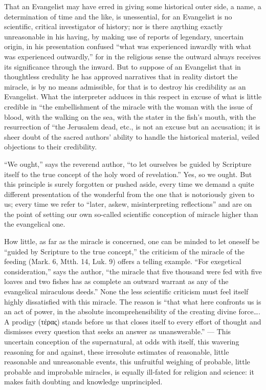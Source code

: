 \documentclass[12pt,a4paper,openany]{book}
\newcommand{\opage}[1]{\marginnote{\footnotesize\textit{[#1]}}}
\begin{document}
That an Evangelist may have erred in giving some historical outer side,
a name, a determination of time
and the like, is unessential, for an Evangelist is
no scientific, critical investigator of history; nor
is there anything exactly unreasonable in his having, by making use of reports
of legendary, uncertain origin, in his presentation
confused ``what was experienced inwardly with what was experienced
outwardly,'' for in the religious sense the outward
always receives its significance through the inward. But to suppose
of an Evangelist that in thoughtless credulity he has
approved narratives that in reality distort
the miracle, is by no means admissible, for that is to destroy
his credibility as an Evangelist. What
the interpreter adduces in this respect in excuse
of what is little credible in ``the embellishment of the miracle with
the woman with the issue of blood, with the walking on the sea, with
the stater in the fish's mouth, with the resurrection of ``the Jerusalem
dead, etc., is not an excuse but an accusation;
it is sheer doubt of the sacred authors' ability
to handle the historical material, veiled objections
to their credibility.

``We ought,'' says the reverend author, ``to let ourselves be guided by Scripture
itself to the true concept of the
holy word of revelation.'' Yes, so we ought. But this
principle is surely forgotten or pushed aside, every
time we demand a quite different presentation of the
wonderful from the one that is notoriously given to us; every
time we refer to ``later, askew, misinterpreting reflections''
and are on the point of setting our own so-called
\setcounter{footnote}{0}%
\opage{307}scientific conception of miracle higher than the evangelical one.

How little, as far as the miracle is concerned, one can be minded
to let oneself be ``guided by Scripture to the true concept,''
the criticism of the miracle of the feeding
(Mark. 6, Mtth. 14, Luk. 9) offers a telling example. ``For
exegetical consideration,'' says the author, ``the miracle
that five thousand were fed with five loaves and two
fishes has as complete an outward warrant as any of
the evangelical miraculous deeds.'' None the less
scientific criticism must feel itself highly dissatisfied
with this miracle. The reason is ``that what
here confronts us is an act of power, in the absolute incomprehensibility
of the creating divine force\dots{}. A prodigy
(τέρας) stands before us that closes itself to every
effort of thought and dismisses every question that seeks
an answer as unanswerable.'' --- This uncertain conception of the supernatural, at odds
with itself, this wavering
reasoning for and against, these irresolute estimates
of reasonable, little reasonable and unreasonable events,
this unfruitful weighing of probable, little
probable and improbable miracles, is equally
ill-fated for religion and science: it makes
faith doubting and knowledge unprincipled.
\end{document}
